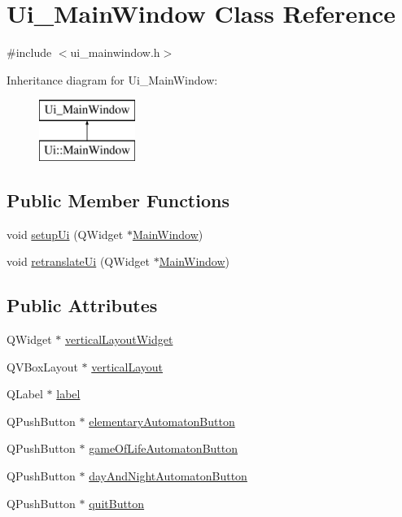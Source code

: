 \hypertarget{class_ui___main_window}{}\section{Ui\+\_\+\+Main\+Window Class Reference}
\label{class_ui___main_window}


{\ttfamily \#include $<$ui\+\_\+mainwindow.\+h$>$}

Inheritance diagram for Ui\+\_\+\+Main\+Window\+:\begin{figure}[H]
\begin{center}
\leavevmode
\includegraphics[height=2.000000cm]{class_ui___main_window}
\end{center}
\end{figure}
\subsection*{Public Member Functions}
\begin{DoxyCompactItemize}
\item 
void \mbox{\hyperlink{class_ui___main_window_a306e3013ead511f9bc29513aa0219579}{setup\+Ui}} (Q\+Widget $\ast$\mbox{\hyperlink{class_main_window}{Main\+Window}})
\item 
void \mbox{\hyperlink{class_ui___main_window_ae4964a56cb4d6d76b7a398fd76b200e2}{retranslate\+Ui}} (Q\+Widget $\ast$\mbox{\hyperlink{class_main_window}{Main\+Window}})
\end{DoxyCompactItemize}
\subsection*{Public Attributes}
\begin{DoxyCompactItemize}
\item 
Q\+Widget $\ast$ \mbox{\hyperlink{class_ui___main_window_a805d415fff07a22a85219e1f22f2da28}{vertical\+Layout\+Widget}}
\item 
Q\+V\+Box\+Layout $\ast$ \mbox{\hyperlink{class_ui___main_window_aecd96a04789fcfec3f98d80390ad8184}{vertical\+Layout}}
\item 
Q\+Label $\ast$ \mbox{\hyperlink{class_ui___main_window_ad9c89133780f28e6efa2ec17ceb9cff5}{label}}
\item 
Q\+Push\+Button $\ast$ \mbox{\hyperlink{class_ui___main_window_a5613c6bb86543ddd27755bccdce20874}{elementary\+Automaton\+Button}}
\item 
Q\+Push\+Button $\ast$ \mbox{\hyperlink{class_ui___main_window_a4b98200577e81b32d9382a1bb6f688e7}{game\+Of\+Life\+Automaton\+Button}}
\item 
Q\+Push\+Button $\ast$ \mbox{\hyperlink{class_ui___main_window_adb30cc20a85005e2fc5c17f66655484b}{day\+And\+Night\+Automaton\+Button}}
\item 
Q\+Push\+Button $\ast$ \mbox{\hyperlink{class_ui___main_window_ac57eebecc7233b668421828c160e0cbe}{quit\+Button}}
\end{DoxyCompactItemize}


